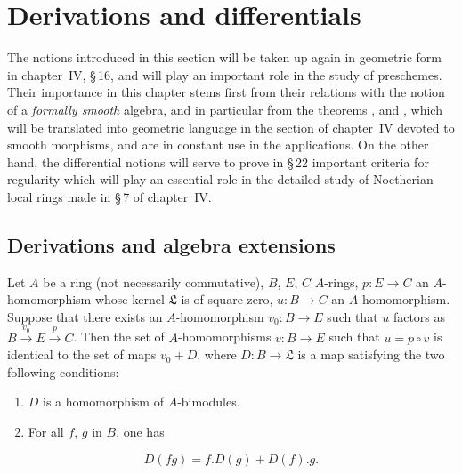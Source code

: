 \section{Derivations and differentials}
\label{section:0.20}

The notions introduced in this section will be taken up again in geometric form in chapter~IV, \S\,16, and will play an important role in the study of preschemes.
Their importance in this chapter stems first from their relations with the notion of a \emph{formally smooth} algebra, and in particular from the theorems ,  and , which will be translated into geometric language in the section of chapter~IV devoted to smooth morphisms, and are in constant use in the applications.
On the other hand, the differential notions will serve to prove in \S\,22 important criteria for regularity which will play an essential role in the detailed study of Noetherian local rings made in \S\,7 of chapter~IV.

\subsection{Derivations and algebra extensions}
\label{subsection:0.20.1}

\begin{proposition}[20.1.1]
\label{0.20.1.1}
Let $A$ be a ring \textup{(not necessarily commutative)}, $B$, $E$, $C$ $A$-rings, $p:E\to C$ an $A$-homomorphism whose kernel $\mathfrak{L}$ is of square zero, $u:B\to C$ an $A$-homomorphism.
Suppose that there exists an $A$-homomorphism $v_0:B\to E$ such that $u$ factors as $B\xrightarrow{v_0}E\xrightarrow{p}C$.
Then the set of $A$-homomorphisms $v:B\to E$ such that $u=p\circ v$ is identical to the set of maps $v_0+D$, where $D:B\to\mathfrak{L}$ is a map satisfying the two following conditions:
\begin{enumerate}
  \item[\rm(i)] $D$ is a homomorphism of $A$-bimodules.
  \item[\rm(ii)] For all $f$, $g$ in $B$, one has
\end{enumerate}
\begin{equation}
\tag{20.1.1.1}
  \label{0.20.1.1.1}
  D(fg) = f.D(g) + D(f).g.
\end{equation}
\end{proposition}

